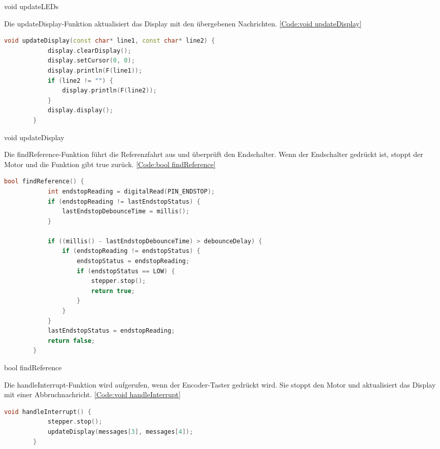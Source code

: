 {{{\begin{code}
	\caption[void updateLEDs]{void updateLEDs}\label{Code:void updateLEDs}    
\end{code}

Die updateDisplay-Funktion aktualisiert das Display mit den übergebenen Nachrichten. \ref{Code:void updateDisplay}

\begin{code}
	\begin{lstlisting}[language=c++]
		void updateDisplay(const char* line1, const char* line2) {
			display.clearDisplay();
			display.setCursor(0, 0);
			display.println(F(line1));
			if (line2 != "") {
				display.println(F(line2));
			}
			display.display();
		}
	\end{lstlisting}      
	
	\caption[void updateDisplay]{void updateDisplay}\label{Code:void updateDisplay}    
\end{code}

Die findReference-Funktion führt die Referenzfahrt aus und überprüft den Endschalter. Wenn der Endschalter gedrückt ist, stoppt der Motor und die Funktion gibt true zurück. \ref{Code:bool findReference}

\begin{code}
	\begin{lstlisting}[language=c++]
		bool findReference() {
			int endstopReading = digitalRead(PIN_ENDSTOP);
			if (endstopReading != lastEndstopStatus) {
				lastEndstopDebounceTime = millis();
			}
			
			if ((millis() - lastEndstopDebounceTime) > debounceDelay) {
				if (endstopReading != endstopStatus) {
					endstopStatus = endstopReading;
					if (endstopStatus == LOW) {
						stepper.stop();
						return true;
					}
				}
			}
			lastEndstopStatus = endstopReading;
			return false;
		}
	\end{lstlisting}      
	
	\caption[bool findReference]{bool findReference}\label{Code:bool findReference}    
\end{code}

Die handleInterrupt-Funktion wird aufgerufen, wenn der Encoder-Taster gedrückt wird. Sie stoppt den Motor und aktualisiert das Display mit einer Abbruchnachricht. \ref{Code:void handleInterrupt}

\begin{code}
	\begin{lstlisting}[language=c++]
		void handleInterrupt() {
			stepper.stop();
			updateDisplay(messages[3], messages[4]);
		}
	\end{lstlisting}      
	

\end{code}}}}
